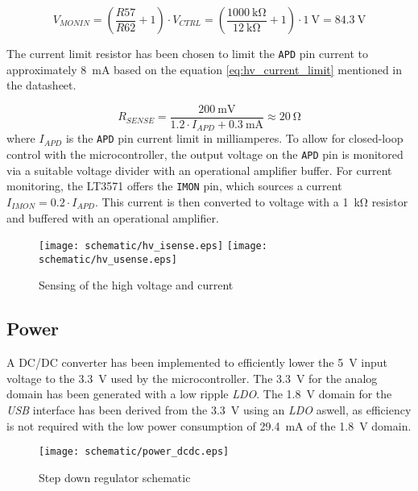 \begin{equation}
V_{MONIN} = (\frac{R57}{R62} + 1) \cdot V_{CTRL} = (\frac{\SI{1000}{\kilo\ohm}}{\SI{12}{\kilo\ohm}} + 1) \cdot \SI{1}{\volt} = \SI{84.3}{\volt}
\label{eq:hv_voltage_fb}
\end{equation}


The current limit resistor has been chosen to limit the \verb|APD| pin current to approximately \SI{8}{\milli\ampere} based on the equation \ref{eq:hv_current_limit} mentioned in the datasheet.

\begin{equation}
R_{SENSE} = \frac{\SI{200}{\milli\volt}}{1.2 \cdot I_{APD} + \SI{0.3}{\milli\ampere}} \approx \SI{20}{\ohm}
\label{eq:hv_current_limit}
\end{equation}
%
where $I_{APD}$ is the \verb|APD| pin current limit in milliamperes.
To allow for closed-loop control with the microcontroller, the output voltage on the \verb|APD| pin is monitored via a suitable voltage divider with an operational amplifier buffer. For current monitoring, the LT3571 offers the \verb|IMON| pin, which sources a current $I_{IMON} = 0.2 \cdot I_{APD}$. This current is then converted to voltage with a \SI{1}{\kilo\ohm} resistor and buffered with an operational amplifier.

\FloatBarrier
\begin{figure}[htp!]
    \centering
    \texttt{[image: schematic/hv\_isense.eps]}
    \texttt{[image: schematic/hv\_usense.eps]}
    \caption{Sensing of the high voltage and current}
    \label{fig:schem_hvsense}
\end{figure}
\FloatBarrier

\subsection{Power}
A DC/DC converter has been implemented to efficiently lower the \SI{5}{\volt} input voltage to the \SI{3.3}{\volt} used by the microcontroller. The \SI{3.3}{\volt} for the analog domain has been generated with a low ripple \emph{LDO}. The \SI{1.8}{\volt} domain for the \emph{USB} interface has been derived from the \SI{3.3}{\volt} using an \emph{LDO} aswell, as efficiency is not required with the low power consumption of \SI{29.4}{\milli\ampere} of the \SI{1.8}{\volt} domain.
\FloatBarrier
\begin{figure}[htp!]
    \centering
    \texttt{[image: schematic/power\_dcdc.eps]}
    \caption{Step down regulator schematic}
    \label{fig:schem_dcdc}
\end{figure}
\FloatBarrier

